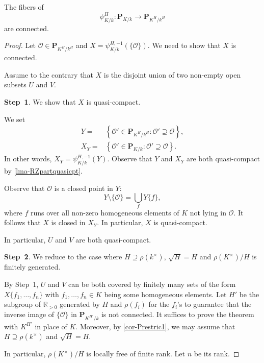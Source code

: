 \begin{proposition}\label{prop-psikkHconnectedfiber}
    The fibers of 
    \[
        \psi_{K/k}^H:\mathbf{P}_{K/k}\rightarrow   \mathbf{P}_{K^H/k^H} 
    \]
    are connected.
\end{proposition}
\begin{proof}
    Let $\mathcal{O}\in \mathbf{P}_{K^H/k^H}$ and $X=\psi_{K/k}^{H,-1}(\{\mathcal{O}\})$. We need to show that $X$ is connected. 
    
    Assume to the contrary that $X$ is the disjoint union of two non-empty open subsets $U$ and $V$. 

    \textbf{Step~1}. We show that $X$ is quasi-compact.

    We set
    \[
        \begin{aligned}
        Y=&\left\{ \mathcal{O}'\in \mathbf{P}_{K^H/k^H}: \mathcal{O}'\supseteq \mathcal{O} \right\} ,\\
        X_Y=&\left\{ \mathcal{O}'\in \mathbf{P}_{K/k}: \mathcal{O}'\supseteq \mathcal{O} \right\}.
        \end{aligned}
    \]
    In other words, $X_Y=\psi_{K/k}^{H,-1}(Y)$.
    Observe that $Y$ and $X_Y$ are both quasi-compact by \cref{lma-RZpartquasicpt}.

    Observe that $\mathcal{O}$ is a closed point in $Y$:
    \[
        Y\setminus \{\mathcal{O}\}=\bigcup_{f} Y\{f\},  
    \]
    where $f$ runs over all non-zero homogeneous elements of $K$ not lying in $\mathcal{O}$. It follows that $X$ is closed in $X_Y$. In particular, $X$ is quasi-compact.

    In particular, $U$ and $V$ are both quasi-compact. 

    \textbf{Step~2}. We reduce to the case where $H\supseteq \rho(k^{\times})$, $\sqrt{H}=H$ and $\rho(K^{\times})/H$ is finitely generated.

    By Step~1, $U$ and $V$ can be both covered by finitely many sets of the form $X\{f_1,\ldots,f_n\}$ with $f_1,\ldots,f_n\in K$ being some homogeneous elements. Let $H'$ be the subgroup of $\mathbb{R}_{>0}$ generated by $H$ and $\rho(f_i)$ for the $f_i$'s to guarantee that the inverse image of $\{\mathcal{O}\}$ in $\mathbf{P}_{K^{H'}/k}$ is not connected. It suffices to prove the theorem with $K^{H'}$ in place of $K$. Moreover, by \cref{cor-Prestric1}, we may assume that $H\supseteq \rho(k^{\times})$ and $\sqrt{H}=H$.

    In particular, $\rho(K^{\times})/H$ is locally free of finite rank. Let $n$ be its rank.


\end{proof}

